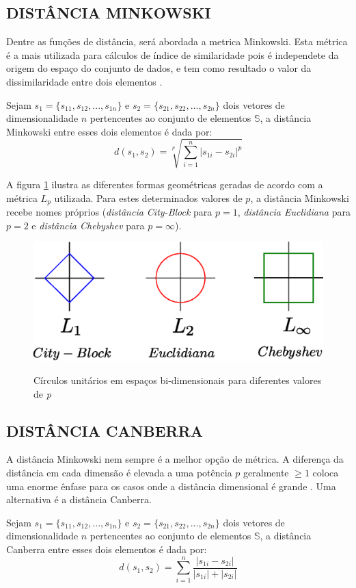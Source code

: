 \subsection{DISTÂNCIA MINKOWSKI}
Dentre as funções de distância, será abordada a metrica Minkowski. Esta métrica é a mais utilizada para cálculos de índice de similaridade
pois é independete da origem do espaço do conjunto de dados, e tem como resultado o valor da dissimilaridade entre dois elementos \cite{Jain1988}.
\begin{mydef}
\label{def:mink}
  Sejam $s_1 = \{s_{11},s_{12},...,s_{1n}\}$ e $s_2 = \{s_{21},s_{22},...,s_{2n}\}$ dois vetores de dimensionalidade $n$ pertencentes ao conjunto de
  elementos $\mathbb{S}$, a distância Minkowski entre esses dois elementos é dada por:
\begin{equation}
		d(s_1,s_2) = \sqrt[p]{\sum_{i=1}^{n}|s_{1i} - s_{2i}|^p}
\end{equation}
\end{mydef}

A figura \ref{fig:minko} ilustra as diferentes formas geométricas geradas de acordo com a métrica $L_p$ utilizada. Para estes determinados valores de $p$, a distância Minkowski recebe nomes
próprios (\textit{distância City-Block} para $p = 1$, \textit{distância Euclidiana} para $p = 2$ e \textit{distância Chebyshev} para $p = \infty$).

\begin{figure}[H]
\centering
\caption{Círculos unitários em espaços bi-dimensionais para diferentes valores de \textit{p}}
\includegraphics[width=.7\textwidth]{dados/figuras/minko.eps}
\label{fig:minko}
\end{figure}

\subsection{DISTÂNCIA CANBERRA}
A distância Minkowski nem sempre é a melhor opção de métrica. A diferença da distância em cada dimensão é elevada
a uma potência $p$ geralmente $\geq 1$  coloca uma enorme ênfase para os casos onde a distância dimensional é grande \cite{Kokare2007}.
Uma alternativa é a distância Canberra.
\begin{mydef}
 \label{def:canb}
 Sejam $s_1 = \{s_{11},s_{12},...,s_{1n}\}$ e $s_2 = \{s_{21},s_{22},...,s_{2n}\}$ dois vetores de dimensionalidade $n$ pertencentes ao conjunto de
  elementos $\mathbb{S}$, a distância Canberra entre esses dois elementos é dada por:
  \begin{equation}
   d(s_1,s_2) = \sum_{i=1}^{n}\frac{|s_{1i} - s_{2i}|}{|s_{1i}| + |s_{2i}|}
  \end{equation}
\end{mydef}


